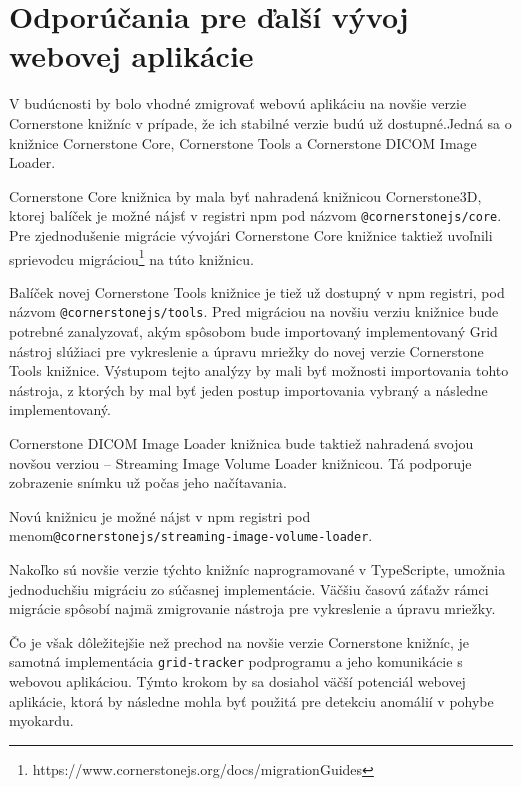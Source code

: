 \chapter {Odporúčania pre ďalší vývoj webovej aplikácie}
V budúcnosti by bolo vhodné zmigrovať webovú aplikáciu na novšie verzie Cornerstone knižníc v prípade, že ich stabilné verzie budú už dostupné.\newline Jedná sa o knižnice Cornerstone Core, Cornerstone Tools a Cornerstone DICOM Image Loader.

Cornerstone Core knižnica by mala byť nahradená knižnicou Cornerstone3D, ktorej balíček je možné nájsť v registri npm pod názvom \newline \texttt{@cornerstonejs/core}. Pre zjednodušenie migrácie vývojári Cornerstone Core knižnice taktiež uvoľnili sprievodcu migráciou\footnote{https://www.cornerstonejs.org/docs/migrationGuides} na túto knižnicu.

Balíček novej Cornerstone Tools knižnice je tiež už dostupný v npm registri, pod názvom \texttt{@cornerstonejs/tools}. Pred migráciou na novšiu verziu knižnice bude potrebné zanalyzovať, akým spôsobom bude importovaný implementovaný Grid nástroj slúžiaci pre vykreslenie a úpravu mriežky do novej verzie Cornerstone Tools knižnice. Výstupom tejto analýzy by mali byť možnosti importovania tohto nástroja, z ktorých by mal byť jeden postup importovania vybraný a následne implementovaný.

\clearpage

Cornerstone DICOM Image Loader knižnica bude taktiež nahradená svojou novšou verziou -- Streaming Image Volume Loader knižnicou. Tá podporuje zobrazenie snímku už počas jeho načítavania.

Novú knižnicu je možné nájst v npm registri pod menom\newline \texttt{@cornerstonejs/streaming-image-volume-loader}.

Nakoľko sú novšie verzie týchto knižníc naprogramované v TypeScripte, umožnia jednoduchšiu migráciu zo súčasnej implementácie. Väčšiu časovú záťaž\newline v rámci migrácie spôsobí najmä zmigrovanie nástroja pre vykreslenie a úpravu mriežky.

Čo je však dôležitejšie než prechod na novšie verzie Cornerstone knižníc, je samotná implementácia \texttt{grid-tracker} podprogramu a jeho komunikácie s webovou aplikáciou. Týmto krokom by sa dosiahol väčší potenciál webovej aplikácie, ktorá by následne mohla byť použitá pre detekciu anomálií v pohybe myokardu.